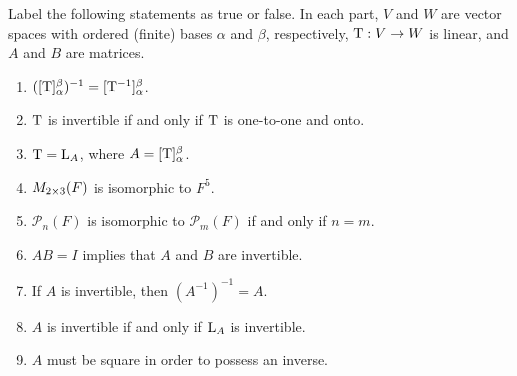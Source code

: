 \exercisesection

\begin{exercise} \label{exercise 2.4.1}
Label the following statements as true or false.
In each part, \(V\) and \(W\) are vector spaces with ordered (finite) bases \(\alpha\) and \(\beta\), respectively, \(\mathrm{T}: V \to W\) is linear, and \(A\) and \(B\) are matrices.
\begin{enumerate}
\item \(([\mathrm{T}]_{\alpha}^{\beta})^{-1} = [\mathrm{T}^{-1}]_{\alpha}^{\beta}\).
\item \(\mathrm{T}\) is invertible if and only if \(\mathrm{T}\) is one-to-one and onto.
\item \(\mathrm{T} = \mathrm{L}_A\), where \(A = [\mathrm{T}]_{\alpha}^{\beta}\).
\item \(M_{2 \times 3}(F)\) is isomorphic to \(F^5\).
\item \(\mathcal{P}_n(F)\) is isomorphic to \(\mathcal{P}_m(F)\) if and only if \(n = m\).
\item \(AB = I\) implies that \(A\) and \(B\) are invertible.
\item If \(A\) is invertible, then \((A^{-1})^{-1} = A\).
\item \(A\) is invertible if and only if \(\mathrm{L}_A\) is invertible.
\item \(A\) must be square in order to possess an inverse.
\end{enumerate}
\end{exercise}

